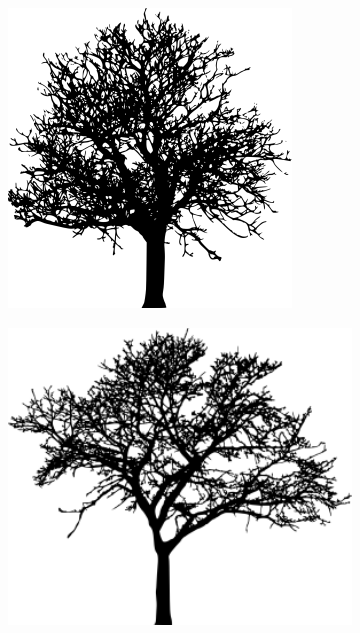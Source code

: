 \documentclass[
  letterpaper,
  DIV=11,
  numbers=noendperiod]{scrartcl}
\begin{document}
\begin{figure}

\begin{minipage}{0.33\linewidth}

\begin{figure}[H]

{\centering \includegraphics[width=\linewidth,height=3.125in,keepaspectratio]{tree_01.png}

}


\end{figure}%

\end{minipage}%
%
\begin{minipage}{0.33\linewidth}

\begin{figure}[H]

{\centering \includegraphics[width=\linewidth,height=3.125in,keepaspectratio]{tree_02.png}

}


\end{figure}
\end{minipage}
\end{figure}
\end{document}
